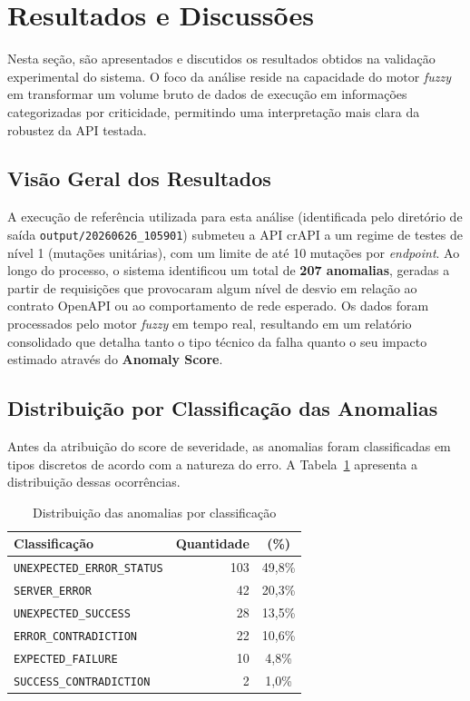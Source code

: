 \section{Resultados e Discussões}

Nesta seção, são apresentados e discutidos os resultados obtidos na validação experimental do sistema. O foco da análise reside na capacidade do motor \textit{fuzzy} em transformar um volume bruto de dados de execução em informações categorizadas por criticidade, permitindo uma interpretação mais clara da robustez da API testada.

\subsection{Visão Geral dos Resultados}

A execução de referência utilizada para esta análise (identificada pelo diretório de saída \texttt{output/20260626\_105901}) submeteu a API crAPI \cite{crapi} a um regime de testes de nível 1 (mutações unitárias), com um limite de até 10 mutações por \textit{endpoint}. Ao longo do processo, o sistema identificou um total de \textbf{207 anomalias}, geradas a partir de requisições que provocaram algum nível de desvio em relação ao contrato OpenAPI \cite{openapi} ou ao comportamento de rede esperado. Os dados foram processados pelo motor \textit{fuzzy} em tempo real, resultando em um relatório consolidado que detalha tanto o tipo técnico da falha quanto o seu impacto estimado através do \textbf{Anomaly Score}.

\subsection{Distribuição por Classificação das Anomalias}

Antes da atribuição do score de severidade, as anomalias foram classificadas em tipos discretos de acordo com a natureza do erro. A Tabela~\ref{tab:classificacao} apresenta a distribuição dessas ocorrências.

\begin{table}[H]
\centering
\caption{Distribuição das anomalias por classificação}
\label{tab:classificacao}
\footnotesize
\begin{tabular}{lrc}
\hline
\textbf{Classificação} & \textbf{Quantidade} & \textbf{(\%)} \\
\hline
\texttt{UNEXPECTED\_ERROR\_STATUS} & 103 & 49,8\% \\
\texttt{SERVER\_ERROR} & 42 & 20,3\% \\
\texttt{UNEXPECTED\_SUCCESS} & 28 & 13,5\% \\
\texttt{ERROR\_CONTRADICTION} & 22 & 10,6\% \\
\texttt{EXPECTED\_FAILURE} & 10 & 4,8\% \\
\texttt{SUCCESS\_CONTRADICTION} & 2 & 1,0\% \\
\hline
\end{tabular}
\end{table}

